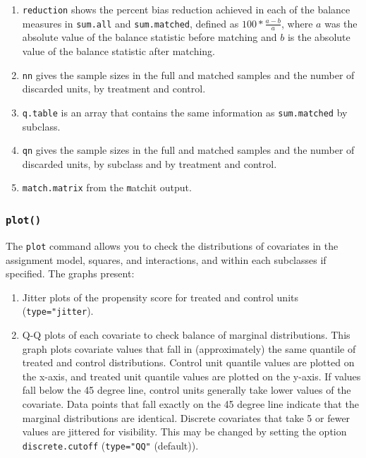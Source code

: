 \documentclass[oneside,letterpaper,titlepage]{article}
\begin{document}
\begin{enumerate}
\item \texttt{reduction} shows the percent bias reduction achieved in
  each of the balance measures in \texttt{sum.all} and
  \texttt{sum.matched}, defined as $100*\frac{a-b}{a}$, where $a$ was
  the absolute value of the balance statistic before matching and $b$
  is the absolute value of the balance statistic after matching.

\item \texttt{nn} gives the sample sizes in the full and matched
  samples and the number of discarded units, by treatment and control.
  
\item \texttt{q.table} is an array that contains the same information
  as \texttt{sum.matched} by subclass.
  
\item \texttt{qn} gives the sample sizes in the full and matched
  samples and the number of discarded units, by subclass and by treatment and control.
\item \texttt{match.matrix} from the {\texttt matchit} output.
\end{enumerate}

\subsubsection{{\tt plot()}}

The \texttt{plot} command allows you to check the distributions of
covariates in the assignment model, squares, and interactions, and
within each subclasses if specified.  The graphs present:
\begin{enumerate}
\item Jitter plots of the propensity score for treated and control
  units (\texttt{type="jitter}).
\item Q-Q plots of each covariate to check balance of marginal
  distributions.  This graph plots covariate values that fall in
  (approximately) the same quantile of treated and control
  distributions.  Control unit quantile values are plotted on the
  x-axis, and treated unit quantile values are plotted on the y-axis.
  If values fall below the 45 degree line, control units generally
  take lower values of the covariate.  Data points that fall exactly
  on the 45 degree line indicate that the marginal distributions are
  identical.  Discrete covariates that take 5 or fewer values are
  jittered for visibility.  This may be changed by setting the option
  \texttt{discrete.cutoff} (\texttt{type="QQ"} (default)).
\end{enumerate}
\end{document}
